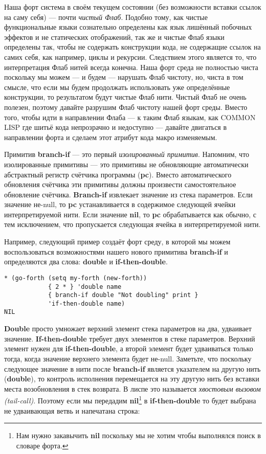 Наша форт система в своём текущем состоянии (без возможности вставки ссылок на саму себя) --- почти \emph{чистый Флаб}. Подобно тому, как чистые функциональные языки сознательно определены как язык лишённый побочных эффектов и не статических отображений, так же и чистые Флаб языки определены так, чтобы не содержать конструкции кода, не содержащие ссылок на самих себя, как например, циклы и рекурсии. Следствием этого является то, что интерпретация Флаб нитей всегда конечна. Наша форт среда не полностью чиста поскольку мы можем --- и будем --- нарушать Флаб чистоту, но, чиста в том смысле, что если мы будем продолжать использовать уже определённые конструкции, то результатом будут чистые Флаб нити. Чистый Флаб не очень полезен, поэтому давайте разрушим Флаб чистоту нашей форт среды. Вместо того, чтобы идти в направлении Флаба --- к таким Флаб языкам, как COMMON LISP где шитьё кода непрозрачно и недоступно --- давайте двигаться в направлении форта и сделаем этот атрибут кода макро изменяемым.

Примитив \textbf{branch-if} --- это первый \emph{изолированный примитив}. Напомним, что изолированные примитивы --- это примитивы не обновляющие автоматически абстрактный регистр счётчика программы (\textbf{pc}). Вместо автоматического обновления счётчика эти примитивы должны произвести самостоятельное обновление счётчика. \textbf{Branch-if} извлекает значение из стека параметров. Если значение не-null, то \textbf{pc} устанавливается в содержимое следующей ячейки интерпретируемой нити. Если значение \textbf{nil}, то \textbf{pc} обрабатывается как обычно, с тем исключением, что пропускается следующая ячейка в интерпретируемой нити.

Например, следующий пример создаёт форт среду, в которой мы можем воспользоваться возможностями нашего нового примитива \textbf{branch-if} и определяются два слова: \textbf{double} и \textbf{if-then-double}.

\begin{verbatim}
* (go-forth (setq my-forth (new-forth))
            { 2 * } 'double name
            { branch-if double "Not doubling" print }
            'if-then-double name)
NIL
\end{verbatim}

\textbf{Double} просто умножает верхний элемент стека параметров на два, удваивает значение. \textbf{If-then-double} требует двух элементов в стеке параметров. Верхний элемент нужен для \textbf{if-then-double}, а второй элемент будет удваиваться только тогда, когда значение верхнего элемента будет не-null. Заметьте, что поскольку следующее значение в нити после \textbf{branch-if} является указателем на другую нить (\textbf{double}), то контроль исполнения перемещается на эту другую нить без вставки места возобновления в стек возврата. В лиспе это называется \emph{хвостовым вызовом (tail-call)}. Поэтому если мы передадим \textbf{nil}\footnote{Нам нужно закавычить \textbf{nil} поскольку мы не хотим чтобы выполнялся поиск в словаре форта.} в \textbf{if-then-double} то будет выбрана не удваивающая ветвь и напечатана строка:


